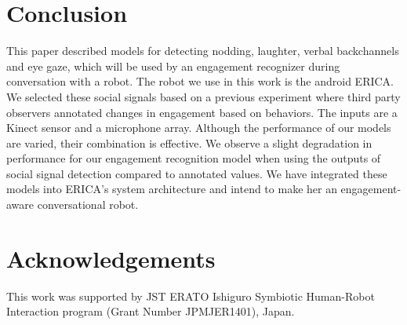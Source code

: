\documentclass[letterpaper]{article} %
\begin{document}
\section{Conclusion}
This paper described models for detecting nodding, laughter, verbal backchannels and eye gaze, which will be used by an engagement recognizer during conversation with a robot. The robot we use in this work is the android ERICA. We selected these social signals based on a previous experiment where third party observers annotated changes in engagement based on behaviors. The inputs are a Kinect sensor and a microphone array. Although the performance of our models are varied, their combination is effective. We observe a slight degradation in performance for our engagement recognition model when using the outputs of social signal detection compared to annotated values. We have integrated these models into ERICA's system architecture and intend to make her an engagement-aware conversational robot.

\section{Acknowledgements}
This work was supported by JST ERATO Ishiguro Symbiotic Human-Robot Interaction program (Grant Number JPMJER1401), Japan.
\end{document}
